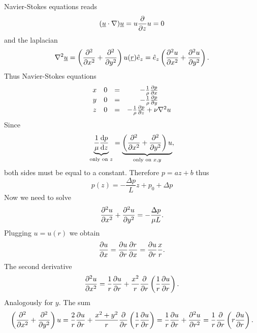 \documentclass[../main.tex]{subfiles}
\begin{document}
    Navier-Stokes equations reads 
    \begin{displaymath}
      (\underline{u} \cdot \nabla) \underline{u} = u \frac{\partial }{\partial z} u = 0
    \end{displaymath}
    and the laplacian
    \begin{displaymath}
      \nabla^2 \underline{u} = \left( \frac{\partial^2 }{\partial x ^ 2} + \frac{\partial^2 }{\partial y ^ 2} \right) u(\underline{r}) \hat{e}_z = \hat{e}_z \left( \frac{\partial^2 u}{\partial x ^ 2} + \frac{\partial^2 u}{\partial y ^ 2} \right).
    \end{displaymath}
    Thus Navier-Stokes equations 
    \begin{displaymath}
      \begin{matrix}
        x & 0 &=& - \frac{1}{\rho} \frac{\partial p}{\partial x}\\
        y & 0 &=& - \frac{1}{\rho} \frac{\partial p}{\partial y}\\
        z & 0 &=& - \frac{1}{\rho} \frac{\partial p}{\partial z} + \nu \nabla^2 u\\
      \end{matrix}
    \end{displaymath}
    Since 
    \begin{displaymath}
      \underbrace{\frac{1}{\mu} \frac{\mathrm{d} p}{\mathrm{d} z}}_{\textrm{only on }z} = \underbrace{\left( \frac{\partial^2 }{\partial x ^ 2} + \frac{\partial^2 }{\partial y ^ 2} \right) u}_{\textrm{only on }x, y},
    \end{displaymath}
    both sides must be equal to a constant.
    Therefore $p = a z + b$ thus
    \begin{displaymath}
      p(z) = - \frac{\Delta p}{L}z + p_0 + \Delta p
    \end{displaymath}
    Now we need to solve 
    \begin{displaymath}
      \frac{\partial^2 u}{\partial x ^ 2} + \frac{\partial^2 u}{\partial y ^ 2} =- \frac{\Delta p}{\mu L}.
    \end{displaymath}
    Plugging $u = u(r)$ we obtain
    \begin{displaymath}
      \frac{\partial u}{\partial x} = \frac{\partial u}{\partial r} \frac{\partial r}{\partial x} = \frac{\partial u}{\partial r} \frac{x}{r}.
    \end{displaymath}
    The second derivative 
    \begin{displaymath}
      \frac{\partial^2 u}{\partial x ^ 2} = \frac{1}{r} \frac{\partial u}{\partial r} + \frac{x^2}{r} \frac{\partial }{\partial r} \left( \frac{1}{r} \frac{\partial u}{\partial r} \right).
    \end{displaymath}
    Analogously for $y$.
    The sum
    \begin{displaymath}
      \left( \frac{\partial^2 }{\partial x ^ 2} + \frac{\partial^2 }{\partial y ^ 2} \right) u = \frac{2}{r} \frac{\partial u}{\partial r} + \frac{x^2 + y^2}{r} \frac{\partial }{\partial r} \left( \frac{1}{r}\frac{\partial u}{\partial r} \right)
      = \frac{1}{r} \frac{\partial u}{\partial r} + \frac{\partial^2 u}{\partial r ^ 2} = \frac{1}{r} \frac{\partial }{\partial r} \left( r \frac{\partial u}{\partial r} \right).
    \end{displaymath}
\end{document}
